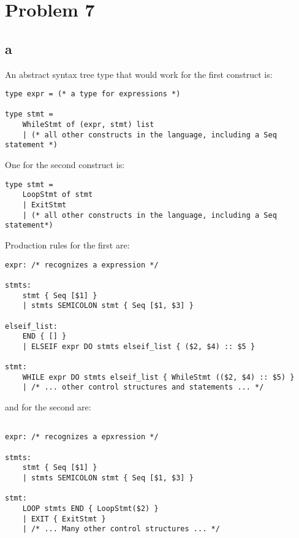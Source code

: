 \section{Problem 7}

\subsection{a}
An abstract syntax tree type that would work for the first construct is:

\begin{lstlisting}[language=Ml]
type expr = (* a type for expressions *)

type stmt = 
    WhileStmt of (expr, stmt) list
    | (* all other constructs in the language, including a Seq statement *)
\end{lstlisting}

One for the second construct is:

\begin{lstlisting}[language=Ml]
type stmt =
    LoopStmt of stmt
    | ExitStmt
    | (* all other constructs in the language, including a Seq statement*)

\end{lstlisting}

Production rules for the first are:

\begin{lstlisting}[language=Ml]
expr: /* recognizes a expression */

stmts:
    stmt { Seq [$1] }
    | stmts SEMICOLON stmt { Seq [$1, $3] }

elseif_list:
    END { [] }
    | ELSEIF expr DO stmts elseif_list { ($2, $4) :: $5 }

stmt:
    WHILE expr DO stmts elseif_list { WhileStmt (($2, $4) :: $5) }
    | /* ... other control structures and statements ... */

\end{lstlisting}

and for the second are:

\begin{lstlisting}[language=Ml]

expr: /* recognizes a epxression */

stmts:
    stmt { Seq [$1] }
    | stmts SEMICOLON stmt { Seq [$1, $3] }

stmt:
    LOOP stmts END { LoopStmt($2) }
    | EXIT { ExitStmt }
    | /* ... Many other control structures ... */

\end{lstlisting}

